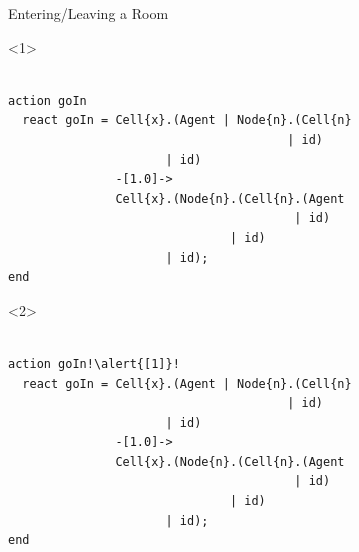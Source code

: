 \documentclass{beamer}
\begin{document}
\begin{frame}[fragile]{Entering/Leaving a Room}
  \begin{onlyenv}<1>
\begin{lstlisting}

action goIn
  react goIn = Cell{x}.(Agent | Node{n}.(Cell{n}
                                       | id)
                      | id)
               -[1.0]->
               Cell{x}.(Node{n}.(Cell{n}.(Agent
                                        | id)
                               | id)
                      | id);
end

\end{lstlisting}
  \end{onlyenv}
  \begin{onlyenv}<2>
\begin{lstlisting}[escapechar=!]

action goIn!\alert{[1]}!
  react goIn = Cell{x}.(Agent | Node{n}.(Cell{n}
                                       | id)
                      | id)
               -[1.0]->
               Cell{x}.(Node{n}.(Cell{n}.(Agent
                                        | id)
                               | id)
                      | id);
end

\end{lstlisting}
  \end{onlyenv}
\end{frame}
\end{document}
